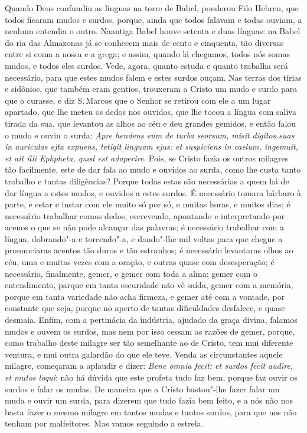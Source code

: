 Quando Deus confundiu as línguas na torre de Babel, ponderou Filo
Hebreu, que todos ficaram mudos e surdos, porque, ainda que todos
falavam e todas ouviam, a nenhum entendia o outro. Naantiga Babel houve
setenta e duas línguas: na Babel do ria das Almazonas já se conhecem
mais de cento e cinquenta, tão diversas entre si coma a nossa e a grega;
e assim, quando lá chegamos, todos nós somas mudos, e todos eles surdos.
Vede, agora, quanto estuda e quanto trabalha será necessário, para que
estes mudos falem e estes surdos ouçam. Nas terras dos tírias e
sidônios, que também eram gentios, trouxeram a Cristo um mudo e surdo
para que o curasse, e diz S.\,Marcos que o
Senhor se retirou com ele a um lugar apartado, que lhe meteu os dedos
nos ouvidos, que lhe tocou a língua com saliva tirada da sua, que
levantou as alhos ao céu e deu grandes gemidos, e então falou o mudo e
ouviu o surda: \emph{Apre hendens eum de turba seorsum, misit digitos
suas in auriculas ejta expuens, tetigit linguam ejus: et suspiciens in
caelum, ingemuit, et ait illi Ephpheta, quod est adaperire}.
Pois, se Cristo fazia os outros milagres tão facilmente, este de dar
fala ao mudo e ouvidos ao surda, como lhe custa tanto trabalho e tantas
diligências? Porque todas estas são necessárias a quem há de dar língua
a estes mudos, e ouvidos a estes surdos. É necessário tomara bárbaro à
parte, e estar e instar com ele muito só por só, e muitas horas, e
muitos dias; é necessário trabalhar comas dedos, escrevendo, apontando e
interpretando por acenos o que se não pode alcançar das palavras; é
necessário trabalhar com a língua, dobrando"-a e torcendo"-a, e dando"-lhe
mil voltas para que chegue a pronunciaras acentos tão duros e tão
estranhos; é necessário levantaras olhos ao céu, uma e muitas vezes com
a oração, e outras quase com desesperação; é necessário, finalmente,
gemer, e gemer com toda a alma: gemer com o entendimento, parque em
tanta escuridade não vê saída, gemer com a memória, porque em tanta
variedade não acha firmeza, e gemer até com a vontade, por constante que
seja, porque no aperto de tantas dificuldades desfalece, e quase
desmaia. Enfim, com a pertinácia da indústria, ajudado da graça divina,
falamos mudos e ouvem os surdos, mas nem por isso cessam as razões de
gemer, porque, como trabalho deste milagre ser tão semelhante ao de
Cristo, tem mui diferente ventura, e mui outra galardão do que ele teve.
Venda as circunstantes aquele milagre, começaram a aplaudir e dizer:
\emph{Bene omnia fecit: et surdos fecit audire, et mutos loqui}: não há dúvida que este profeta tudo faz bem, porque faz
ouvir os surdos e falar os mudas. De maneira que a Cristo bastou"-lhe
fazer falar um muda e ouvir um surda, para dizerem que tudo fazia bem
feito, e a nós não nos basta fazer o mesmo milagre em tantos mudas e
tantos surdos, para que nos não tenham por malfeitores. Mas vamos
seguindo a estrela.

